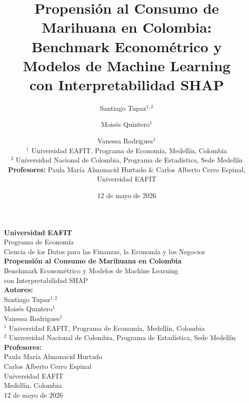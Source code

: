 \documentclass[12pt, a4paper]{article}
\title{Propensión al Consumo de Marihuana en Colombia:\\ Benchmark Econométrico y Modelos de Machine Learning\\ con Interpretabilidad SHAP}
\author{Santiago Tupaz$^{1,2}$ \and Moisés Quintero$^{1}$ \and Vanessa Rodrigues$^{1}$ \\[0.5cm]
{\small $^{1}$ Universidad EAFIT, Programa de Economía, Medellín, Colombia} \\
{\small $^{2}$ Universidad Nacional de Colombia, Programa de Estadística, Sede Medellín} \\[1cm]
{\small \textbf{Profesores:} Paula María Almonacid Hurtado \& Carlos Alberto Cerro Espinal, Universidad EAFIT}}
\date{\small 12 de mayo de 2026}
\begin{document}
\begin{titlepage}
    \centering
    \vspace*{2.5cm}

    {\Large \textbf{Universidad EAFIT}}\\[0.3cm]
    {\normalsize Programa de Economía}\\
    {\normalsize Ciencia de los Datos para las Finanzas, la Economía y los Negocios}\\[1.8cm]

    {\large \textbf{Propensión al Consumo de Marihuana en Colombia}}\\[0.4cm]
    {\small Benchmark Econométrico y Modelos de Machine Learning\\ con Interpretabilidad SHAP}\\[1.8cm]

    {\normalsize
    \textbf{Autores:}\\
    Santiago Tupaz$^{1,2}$\\
    Moisés Quintero$^{1}$\\
    Vanessa Rodrigues$^{1}$
    }\\[1.2cm]

    {\small
    $^{1}$ Universidad EAFIT, Programa de Economía, Medellín, Colombia\\[0.3cm]
    $^{2}$ Universidad Nacional de Colombia, Programa de Estadística, Sede Medellín
    }\\[1.2cm]

    {\normalsize
    \textbf{Profesores:}\\
    Paula María Almonacid Hurtado\\
    Carlos Alberto Cerro Espinal\\
    {\small Universidad EAFIT}
    }\\[2.0cm]

    {\normalsize
    Medellín, Colombia\\
    12 de mayo de 2026
    }

    \vfill
\end{titlepage}
\end{document}
